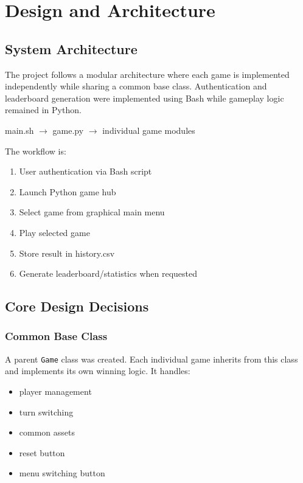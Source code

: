 \documentclass[12pt,a4paper]{article}
\begin{document}
\section{Design and Architecture}

\subsection{System Architecture}

The project follows a modular architecture where each game is implemented independently while sharing a common base class. Authentication and leaderboard generation were implemented using Bash while gameplay logic remained in Python.

\begin{center}
main.sh $\rightarrow$ game.py $\rightarrow$ individual game modules
\end{center}

The workflow is:

\begin{enumerate}
    \item User authentication via Bash script
    \item Launch Python game hub
    \item Select game from graphical main menu
    \item Play selected game
    \item Store result in history.csv
    \item Generate leaderboard/statistics when requested
\end{enumerate}

\subsection{Core Design Decisions}

\subsubsection{Common Base Class}

A parent \texttt{Game} class was created. Each individual game inherits from this class and implements its own winning logic. It handles:

\begin{itemize}
    \item player management
    \item turn switching
    \item common assets
    \item reset button
    \item menu switching button
\end{itemize}
\end{document}
